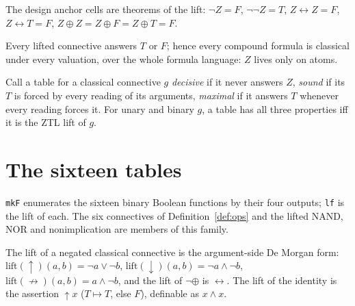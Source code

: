 \begin{theorem}\label{thm:anchors}
  \leanok
  The design anchor cells are theorems of the lift: $\neg Z=F$,
  $\neg\neg Z=T$, $Z\leftrightarrow Z=F$, $Z\leftrightarrow T=F$,
  $Z\oplus Z=Z\oplus F=Z\oplus T=F$.
\end{theorem}

\begin{theorem}[Greediness]\label{thm:greedy}
  \leanok
  Every lifted connective answers $T$ or $F$; hence every compound formula is
  classical under every valuation, over the whole formula language: $Z$ lives
  only on atoms.
\end{theorem}

\begin{theorem}\label{thm:liftchar}
  \leanok
  Call a table for a classical connective $g$ \emph{decisive} if it never
  answers $Z$, \emph{sound} if its $T$ is forced by every reading of its
  arguments, \emph{maximal} if it answers $T$ whenever every reading forces
  it. For unary and binary $g$, a table has all three properties iff it is
  the ZTL lift of $g$.
\end{theorem}

\chapter{The sixteen tables}

\begin{definition}\label{def:sixteen}
  \leanok
  \texttt{mkF} enumerates the sixteen binary Boolean functions by their four
  outputs; \texttt{lf} is the lift of each. The six connectives of
  Definition~\ref{def:ops} and the lifted NAND, NOR and nonimplication are
  members of this family.
\end{definition}

\begin{theorem}\label{thm:neglifts}
  \leanok
  The lift of a negated classical connective is the argument-side De Morgan
  form: $\mathrm{lift}(\uparrow)(a,b)=\neg a\vee\neg b$,
  $\mathrm{lift}(\downarrow)(a,b)=\neg a\wedge\neg b$,
  $\mathrm{lift}(\not\to)(a,b)=a\wedge\neg b$, and the lift of
  $\neg\oplus$ is $\leftrightarrow$. The lift of the identity is the
  assertion $\uparrow x$ ($T\mapsto T$, else $F$), definable as $x\wedge x$.
\end{theorem}

